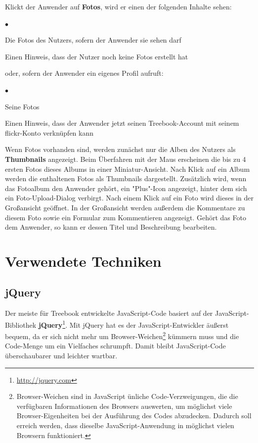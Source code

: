 \documentclass[10pt,a4paper]{book}
\begin{document}
Klickt der Anwender auf \textbf{Fotos}, wird er einen der folgenden Inhalte sehen:
\begin{list}{$\bullet$}{}
\item Die Fotos des Nutzers, sofern der Anwender sie sehen darf
\item Einen Hinweis, dass der Nutzer noch keine Fotos erstellt hat
\end{list}
oder, sofern der Anwender ein eigenes Profil aufruft:
\begin{list}{$\bullet$}{}
\item Seine Fotos
\item Einen Hinweis, dass der Anwender jetzt seinen Treebook-Account mit seinem flickr-Konto verknüpfen kann
\end{list}
Wenn Fotos vorhanden sind, werden zunächst nur die Alben des Nutzers als \textbf{Thumbnails} angezeigt. Beim Überfahren mit der Maus erscheinen die bis zu 4 ersten Fotos dieses Albums in einer Miniatur-Ansicht.
Nach Klick auf ein Album werden die enthaltenen Fotos als Thumbnails dargestellt. Zusätzlich wird, wenn das Fotoalbum den Anwender gehört, ein "Plus"-Icon angezeigt, hinter dem sich ein Foto-Upload-Dialog verbirgt.
Nach einem Klick auf ein Foto wird dieses in der Großansicht geöffnet.
In der Großansicht werden außerdem die Kommentare zu diesem Foto sowie ein Formular zum Kommentieren angezeigt. Gehört das Foto dem Anwender, so kann er dessen Titel und Beschreibung bearbeiten.
\section{Verwendete Techniken}
\subsection{jQuery}
Der meiste für Treebook entwickelte JavaScript-Code basiert auf der JavaScript-Bibliothek \textbf{jQuery}\footnote{\href{http://jquery.com}{http://jquery.com}}. Mit jQuery hat es der JavaScript-Entwickler äußerst bequem, da er sich nicht mehr um Browser-Weichen\footnote{Browser-Weichen sind in JavaScript ünliche Code-Verzweigungen, die die verfügbaren Informationen des Browsers auswerten, um möglichst viele Browser-Eigenheiten bei der Ausführung des Codes abzudecken. Dadurch soll erreich werden, dass dieselbe JavaScript-Anwendung in möglichst vielen Browsern funktioniert.} kümmern muss und die Code-Menge um ein Vielfaches schrumpft. Damit bleibt JavaScript-Code überschaubarer und leichter wartbar.
\end{document}
